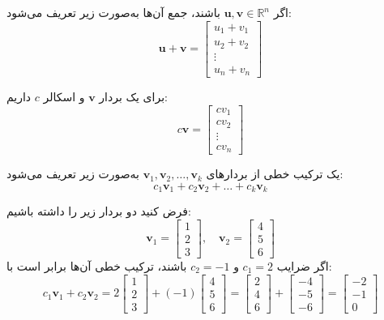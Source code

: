 \begin{definition}
اگر $\mathbf{u}, \mathbf{v} \in \mathbb{R}^n$ باشند، جمع آن‌ها به‌صورت زیر تعریف می‌شود:
\[ \mathbf{u} + \mathbf{v} = \begin{bmatrix} u_1 + v_1 \\ u_2 + v_2 \\ \vdots \\ u_n + v_n \end{bmatrix} \]
\end{definition}
\begin{definition}
برای یک بردار $\mathbf{v}$ و اسکالر $c$ داریم:
\[ c \mathbf{v} = \begin{bmatrix} c v_1 \\ c v_2 \\ \vdots \\ c v_n \end{bmatrix} \]
\end{definition}
\begin{definition}
یک ترکیب خطی از بردارهای $\mathbf{v}_1, \mathbf{v}_2, \dots, \mathbf{v}_k$ به‌صورت زیر تعریف می‌شود:
\[ c_1 \mathbf{v}_1 + c_2 \mathbf{v}_2 + \dots + c_k \mathbf{v}_k \]
\begin{example}
	فرض کنید دو بردار زیر را داشته باشیم:
	\[
	\mathbf{v}_1 = \begin{bmatrix} 1 \\ 2 \\ 3 \end{bmatrix}, \quad
	\mathbf{v}_2 = \begin{bmatrix} 4 \\ 5 \\ 6 \end{bmatrix}
	\]
	اگر ضرایب $c_1 = 2$ و $c_2 = -1$ باشند، ترکیب خطی آن‌ها برابر است با:
	\[
	c_1 \mathbf{v}_1 + c_2 \mathbf{v}_2 =
	2 \begin{bmatrix} 1 \\ 2 \\ 3 \end{bmatrix} +
	(-1) \begin{bmatrix} 4 \\ 5 \\ 6 \end{bmatrix} =
	\begin{bmatrix} 2 \\ 4 \\ 6 \end{bmatrix} +
	\begin{bmatrix} -4 \\ -5 \\ -6 \end{bmatrix} =
	\begin{bmatrix} -2 \\ -1 \\ 0 \end{bmatrix}
	\]
	
\end{example}
\end{definition}
